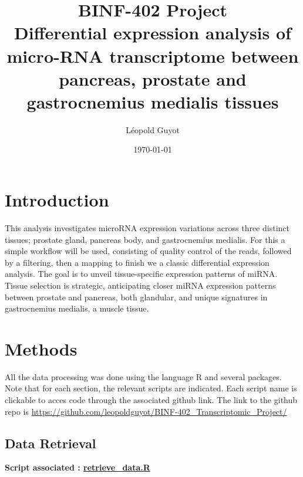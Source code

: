 \documentclass[a4paper, 11pt]{article}
\title{\Large BINF-402 Project \\
\huge Differential expression analysis of micro-RNA transcriptome between pancreas, prostate and gastrocnemius medialis tissues}
\author{Léopold Guyot}
\date{\today}
\begin{document}
\pagestyle{fancy}
\setlength{\headheight}{32.3pt}
\fancyhead{}\fancyfoot{}
\fancyfoot[R]{\thepage}

\maketitle

\begin{multicols}{2}
\section{Introduction}
This analysis investigates microRNA expression variations across three distinct tissues; prostate gland, pancreas body, and gastrocnemius medialis. For this a simple workflow will be used, consisting of quality control of the reads, followed by a filtering, then a mapping to finish we a classic differential expression analysis. The goal is to unveil tissue-specific expression patterns of miRNA. Tissue selection is strategic, anticipating closer miRNA expression patterns between prostate and pancreas, both glandular, and unique signatures in gastrocnemius medialis, a muscle tissue.

\section{Methods}
All the data processing was done using the language R \citep{Rlang} and several packages. Note that for each section, the relevant scripts are indicated. Each script name is clickable to acces code through the associated github link. The link to the github repo is
{\scriptsize \href{https://github.com/leopoldguyot/BINF-402_Transcriptomic_Project/}{https://github.com/leopoldguyot/BINF-402\_Transcriptomic\_Project/}}
\subsection{Data Retrieval}
\begin{scriptsize}
	\textbf{Script associated : \href{https://github.com/leopoldguyot/BINF-402_Transcriptomic_Project/blob/main/retrieve_data.R}{retrieve\_data.R}}
\end{scriptsize}




\end{multicols}
\end{document}
